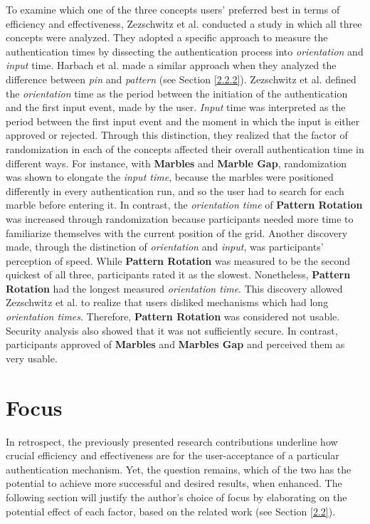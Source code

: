 To examine which one of the three concepts users' preferred best in terms of efficiency and effectiveness, Zezschwitz et al. \cite{Marbles} conducted a study in which all three concepts were analyzed. They adopted a specific approach to measure the authentication times by dissecting the authentication process into \textit{orientation} and \textit{input} time. Harbach et al. \cite{AnatomySmartphone} made a similar approach when they analyzed the difference between \textit{pin} and \textit{pattern} (see Section \ref{2.2.2}). Zezschwitz et al. \cite{Marbles} defined the \textit{orientation} time as the period between the initiation of the authentication and the first input event, made by the user. \textit{Input} time was interpreted as the period between the first input event and the moment in which the input is either approved or rejected. Through this distinction, they realized that the factor of randomization in each of the concepts affected their overall authentication time in different ways. For instance, with \textbf{Marbles} and \textbf{Marble Gap}, randomization was shown to elongate the \textit{input time}, because the marbles were positioned differently in every authentication run, and so the user had to search for each marble before entering it. In contrast, the \textit{orientation time} of \textbf{Pattern Rotation} was increased through randomization because participants needed more time to familiarize themselves with the current position of the grid. Another discovery made, through the distinction of \textit{orientation} and \textit{input}, was participants' perception of speed. While \textbf{Pattern Rotation} was measured to be the second quickest of all three, participants rated it as the slowest. Nonetheless, \textbf{Pattern Rotation} had the longest measured \textit{orientation time}. This discovery allowed Zezschwitz et al. \cite{Marbles} to realize that users disliked mechanisms which had long \textit{orientation times}. Therefore, \textbf{Pattern Rotation} was considered not usable. Security analysis also showed that it was not sufficiently secure. In contrast, participants approved of \textbf{Marbles} and \textbf{Marbles Gap} and perceived them as very usable.

\section{Focus} \label{2.3}

In retrospect, the previously presented research contributions underline how crucial efficiency and effectiveness are for the user-acceptance of a particular authentication mechanism. Yet, the question remains, which of the two has the potential to achieve more successful and desired results, when enhanced. The following section will justify the author's choice of focus by elaborating on the potential effect of each factor, based on the related work (see Section \ref{2.2}). \\

